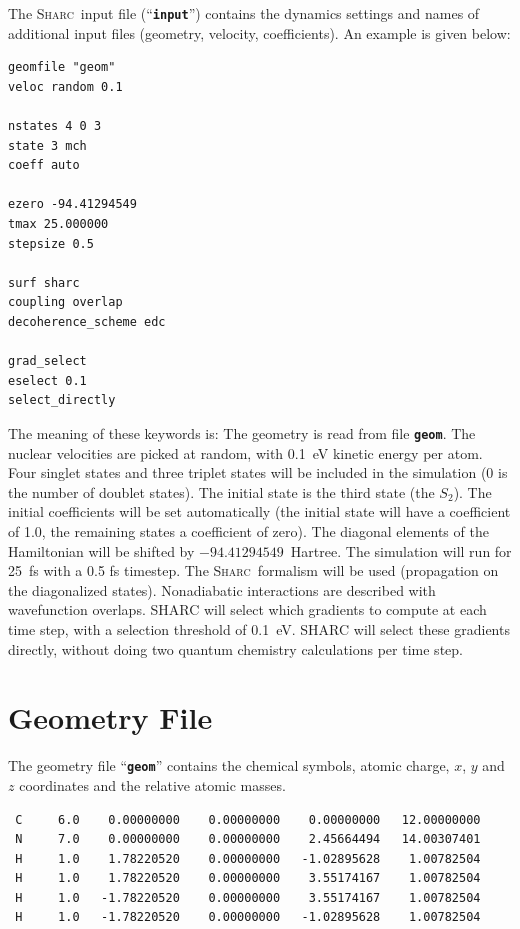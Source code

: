 \documentclass[a4paper,11pt,DIV=15,openany]{scrbook}
\newcommand{\sharc}{\textsc{Sharc}}
\newcommand{\ttt}[1]{\textbf{\texttt{#1}}}
\newenvironment{example}{
  \vspace{0mm}
  \definecolor{shadecolor}{HTML}{E4F4FF}
  \begin{shaded}
}{
  \end{shaded}
}
\begin{document}
The \sharc\ input file (``\ttt{input}'') contains the dynamics settings and names of additional input files (geometry, velocity, coefficients). An example is given below:
\begin{example}\vspace{-8mm}
\begin{verbatim}
geomfile "geom"
veloc random 0.1

nstates 4 0 3
state 3 mch
coeff auto

ezero -94.41294549
tmax 25.000000
stepsize 0.5

surf sharc
coupling overlap
decoherence_scheme edc

grad_select
eselect 0.1
select_directly
\end{verbatim}\vspace{-5mm}
\end{example}

The meaning of these keywords is: The geometry is read from file \ttt{geom}. 
The nuclear velocities are picked at random, with 0.1~eV kinetic energy per atom. 
Four singlet states and three triplet states will be included in the simulation (0 is the number of doublet states). 
The initial state is the third state (the $S_2$). 
The initial coefficients will be set automatically (the initial state will have a coefficient of 1.0, the remaining states a coefficient of zero). 
The diagonal elements of the Hamiltonian will be shifted by $-94.41294549$~Hartree. 
The simulation will run for 25~fs with a 0.5 fs timestep. 
The \sharc\ formalism will be used (propagation on the diagonalized states). 
Nonadiabatic interactions are described with wavefunction overlaps.
SHARC will select which gradients to compute at each time step, with a selection threshold of 0.1~eV.
SHARC will select these gradients directly, without doing two quantum chemistry calculations per time step.

\section{Geometry File}

The geometry file ``\ttt{geom}'' contains the chemical symbols, atomic charge, $x$, $y$ and $z$ coordinates and the relative atomic masses.

\begin{example}\vspace{-8mm}
\begin{verbatim}
 C     6.0    0.00000000    0.00000000    0.00000000   12.00000000
 N     7.0    0.00000000    0.00000000    2.45664494   14.00307401
 H     1.0    1.78220520    0.00000000   -1.02895628    1.00782504
 H     1.0    1.78220520    0.00000000    3.55174167    1.00782504
 H     1.0   -1.78220520    0.00000000    3.55174167    1.00782504
 H     1.0   -1.78220520    0.00000000   -1.02895628    1.00782504
\end{verbatim}\vspace{-5mm}
\end{example}
\end{document}
